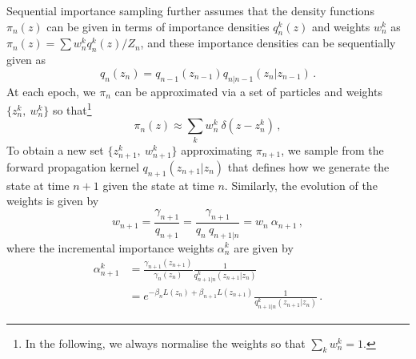 \documentclass[11pt,a4paper]{article}
\begin{document}
		Sequential importance sampling \cite{...} further assumes that the density functions $\pi_n(z)$ can be given in terms of importance densities $q^k_n(z)$ and weights $w^k_n$ as $\pi_n(z) = \sum w^k_n q^k_n(z)/Z_n$, and these importance densities can be sequentially given as
		 \begin{equation}
		 	q_n(z_n) = q_{n-1}(z_{n-1}) q_{n\vert n-1}(z_n\vert z_{n-1})\,.
		 \end{equation}
At each epoch, we $\pi_{n}$ can be approximated via a set of particles and weights $\{z_{n}^k,\ w_{n}^k\}$  so that\footnote{In the following, we always normalise the weights so that $\sum_k w_{n}^k=1$.}
		 \begin{equation}
		 	\pi_n(z) \approx \sum_k w_{n}^k\ \delta(z-z_{n}^k)\,,
		 \end{equation}
To obtain a new set $\{z_{n+1}^k,\ w_{n+1}^k\}$ approximating $\pi_{n+1}$, we sample from the forward propagation kernel $q_{n+1}(z_{n+1}\vert z_n)$ that defines how we generate the state at time $n+1$ given the state at time $n$.
Similarly, the evolution of the weights is given by
\[
	w_{n+1} = \frac{\gamma_{n+1}}{q_{n+1}} = \frac{\gamma_{n+1}}{q_{n}\ q_{n+1 \vert n}} = w_{n}\ \alpha_{n+1}\,,
\]
where the incremental importance weights $\alpha_{n}^k$ are given by
		\begin{equation}	\label{eq: incremental_importance}
			\begin{aligned}
				\alpha^k_{n+1} &= \frac{\gamma_{n+1}(z_{n+1})}{\gamma_{n}(z_n)}\frac1{q^k_{n+1 \vert n}(z_{n+1}\vert z_{n})}	\\
				&=e^{-\beta_nL(z_n)+\beta_{n+1}L(z_{n+1})}\frac1{q^k_{n+1 \vert n}(z_{n+1}\vert z_{n})}\,.
			\end{aligned}
		\end{equation}
		
\end{document}
